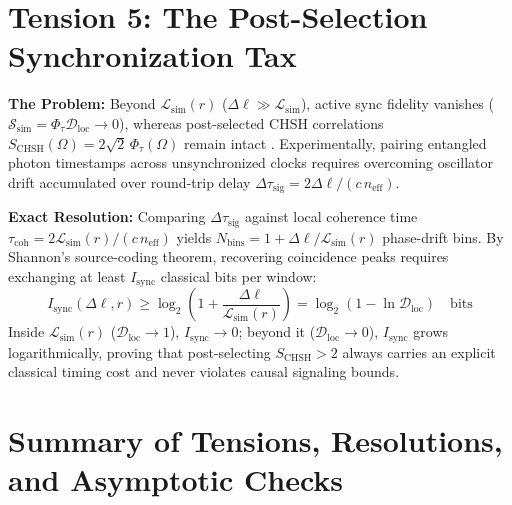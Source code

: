\documentclass[11pt,a4paper]{article}
\begin{document}
\section{Tension 5: The Post-Selection Synchronization Tax}

\textbf{The Problem:} Beyond $\mathcal{L}_{\mathrm{sim}}(r)$ ($\Delta\ell \gg \mathcal{L}_{\mathrm{sim}}$), active sync fidelity vanishes ($\mathcal{S}_{\mathrm{sim}} = \Phi_\tau \mathcal{D}_{\mathrm{loc}} \to 0$), whereas post-selected CHSH correlations $S_{\mathrm{CHSH}}(\Omega) = 2\sqrt{2}\,\Phi_\tau(\Omega)$ remain intact \cite{chsh1969}. Experimentally, pairing entangled photon timestamps across unsynchronized clocks requires overcoming oscillator drift accumulated over round-trip delay $\Delta\tau_{\mathrm{sig}} = 2\Delta\ell / (c \, n_{\mathrm{eff}})$.

\textbf{Exact Resolution:} Comparing $\Delta\tau_{\mathrm{sig}}$ against local coherence time $\tau_{\mathrm{coh}} = 2\mathcal{L}_{\mathrm{sim}}(r) / (c \, n_{\mathrm{eff}})$ yields $N_{\mathrm{bins}} = 1 + \Delta\ell / \mathcal{L}_{\mathrm{sim}}(r)$ phase-drift bins. By Shannon's source-coding theorem, recovering coincidence peaks requires exchanging at least $I_{\mathrm{sync}}$ classical bits per window:
\begin{equation}
    I_{\mathrm{sync}}(\Delta\ell, r) \ge \log_2\!\left(1 + \frac{\Delta\ell}{\mathcal{L}_{\mathrm{sim}}(r)}\right) = \log_2\!\left(1 - \ln\mathcal{D}_{\mathrm{loc}}\right) \quad \mathrm{bits}
\end{equation}
Inside $\mathcal{L}_{\mathrm{sim}}(r)$ ($\mathcal{D}_{\mathrm{loc}} \to 1$), $I_{\mathrm{sync}} \to 0$; beyond it ($\mathcal{D}_{\mathrm{loc}} \to 0$), $I_{\mathrm{sync}}$ grows logarithmically, proving that post-selecting $S_{\mathrm{CHSH}} > 2$ always carries an explicit classical timing cost and never violates causal signaling bounds.
\section{Summary of Tensions, Resolutions, and Asymptotic Checks}
\end{document}
